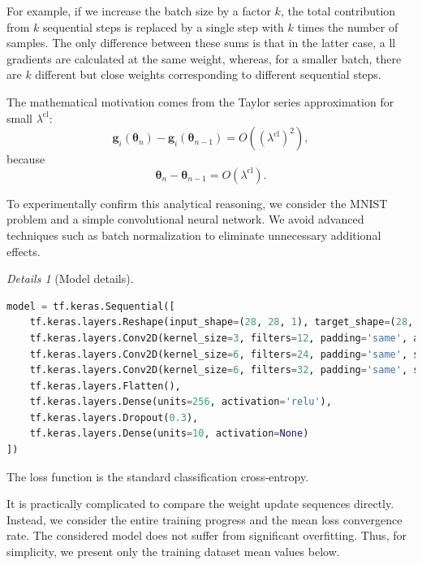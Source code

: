 \documentclass[12pt,a4paper]{amsart}
\numberwithin{equation}{section}
\theoremstyle{remark}
\newtheorem{details}{Details}
\begin{document}
For example, if we increase the batch size by a factor
$k$,
the total contribution from
$k$
sequential steps is replaced by a single step with
$k$
times the number of samples.
The only difference between these sums is that in the latter case, a
ll gradients are calculated at the same weight,
whereas, for a smaller batch,
there are $k$ different but close weights corresponding to different sequential steps.

The mathematical motivation comes from the Taylor series approximation for small
$\lambda^{\text{cl}}$:
$$
	\mathbf{g}_i(\boldsymbol\theta_n) - \mathbf{g}_i(\boldsymbol\theta_{n-1}) =
	O\left(\left(\lambda^{\text{cl}} \right)^2\right),
$$
because
$$
	\boldsymbol\theta_n - \boldsymbol\theta_{n-1} = O(\lambda^{\text{cl}}).
$$

To experimentally confirm this analytical reasoning,
we consider the MNIST problem and a simple convolutional neural network.
We avoid advanced techniques such as batch normalization
to eliminate unnecessary additional effects.
\begin{details}[Model details]~
\begin{lstlisting}[language=Python]
model = tf.keras.Sequential([
    tf.keras.layers.Reshape(input_shape=(28, 28, 1), target_shape=(28, 28, 1)),
    tf.keras.layers.Conv2D(kernel_size=3, filters=12, padding='same', activation='relu'),
    tf.keras.layers.Conv2D(kernel_size=6, filters=24, padding='same', strides=2, activation='relu'),
    tf.keras.layers.Conv2D(kernel_size=6, filters=32, padding='same', strides=2, activation='relu'),
    tf.keras.layers.Flatten(),
    tf.keras.layers.Dense(units=256, activation='relu'),
    tf.keras.layers.Dropout(0.3),
    tf.keras.layers.Dense(units=10, activation=None)
])
\end{lstlisting}
The loss function is the standard classification cross-entropy.
\label{Details: mnist tou model}
\end{details}

It is practically complicated to compare the weight update sequences directly.
Instead, we consider the entire training progress and the mean loss convergence rate.
The considered model does not suffer from significant overfitting.
Thus, for simplicity, we present only the training dataset mean values below.
\end{document}
